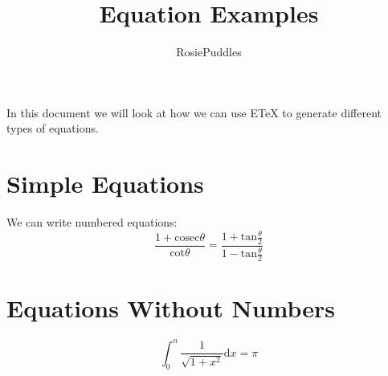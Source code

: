 \documentclass{article}
\title{Equation Examples}
\date{}
\author{RosiePuddles}
\begin{document}
\maketitle
In this document we will look at how we can use ETeX to generate different types of equations.
\section{Simple Equations}
We can write numbered equations:
\begin{equation}
\frac{1+\mathrm{cosec}\theta}{\mathrm{cot}\theta}=\frac{1+\mathrm{tan}\frac\theta 2}{1-\mathrm{tan}\frac\theta 2}
\end{equation}
\section{Equations Without Numbers}
\begin{equation*}
\int_{0}^{n}\frac{1}{\sqrt{1+x^2}}\mathrm{d}x=\pi
\end{equation*}
\end{document}
